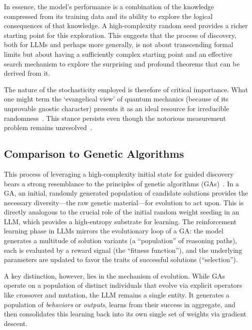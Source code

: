 \documentclass[%
  reprint,
  superscriptaddress,
  showpacs,
  showkeys,
  amsmath,amssymb,
  pra,
  longbibliography,
  floatfix,
  x11names
]{revtex4-2}
\begin{document}
In essence, the model's performance is a combination of the knowledge compressed from its training data and its ability to explore the logical consequences of that knowledge. A high-complexity random seed provides a richer starting point for this exploration. This suggests that the process of discovery, both for LLMs and perhaps more generally, is not about transcending formal limits but about having a sufficiently complex starting point and an effective search mechanism to explore the surprising and profound theorems that can be derived from it.

The nature of the stochasticity employed is therefore of critical importance.
What one might term the `evangelical view' of quantum mechanics (because of its unprovable gnostic character)
presents it as an ideal resource for irreducible randomness~\cite{zeil-05_nature_ofQuantum}.
This stance persists even though the notorious measurement problem remains unresolved~\cite{vonNeumann2018Feb}.

\subsection{Comparison to Genetic Algorithms}

This process of leveraging a high-complexity initial state for guided discovery
bears a strong resemblance to the principles of genetic algorithms (GAs)~\cite{holland1992adaptation}.
In a GA, an initial, randomly generated population of candidate solutions provides
the necessary diversity---the raw genetic material---for evolution to act upon.
This is directly analogous to the crucial role of the initial random weight seeding in an LLM,
which provides a high-entropy substrate for learning.
The reinforcement learning phase in LLMs mirrors the evolutionary loop of a GA:
the model generates a multitude of solution variants (a ``population'' of reasoning paths),
each is evaluated by a reward signal (the ``fitness function''),
and the underlying parameters are updated to favor the traits of successful solutions (``selection'').

A key distinction, however, lies in the mechanism of evolution.
While GAs operate on a population of distinct individuals that evolve via explicit operators
like crossover and mutation, the LLM remains a single entity.
It generates a population of \textit{behaviors} or \textit{outputs},
learns from their success in aggregate, and then consolidates this
learning back into its own single set of weights via gradient descent.
\end{document}
